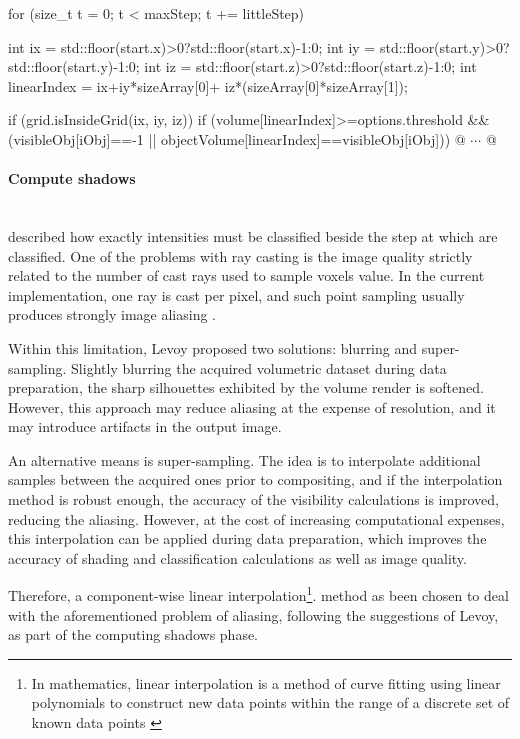 \documentclass[12pt,a4paper]{extarticle}
\newcommand{\linespace}{\vspace{0pt}}
\newcommand{\myparagraph}[1]{\paragraph{#1}\mbox{}\\}
\begin{document}
\begin{cpp}[caption={Intensities classification loop with threshold test and object-wise classification.},label=code:classification]
for (size_t t = 0; t < maxStep; t += littleStep) {
	int ix = std::floor(start.x)>0?std::floor(start.x)-1:0;
	int iy = std::floor(start.y)>0?std::floor(start.y)-1:0;
	int iz = std::floor(start.z)>0?std::floor(start.z)-1:0;
	int linearIndex = ix+iy*sizeArray[0]+
			iz*(sizeArray[0]*sizeArray[1]);
		
	if (grid.isInsideGrid(ix, iy, iz)) {
		if (volume[linearIndex]>=options.threshold && 
			(visibleObj[iObj]==-1 || 
			 objectVolume[linearIndex]==visibleObj[iObj])) {
		@ $\cdots$ @
		}
	}
}
\end{cpp}

\myparagraph{Compute shadows}
\cite{levoy_1988:4} described how exactly intensities must be classified beside the step at which are classified.
One of the problems with ray casting is the image quality strictly related to the number of cast rays used to sample voxels value. In the current implementation, one ray is cast per pixel, and such point sampling usually produces strongly image aliasing \cite{levoy_1988:4}.

Within this limitation, Levoy proposed two solutions: blurring and super-sampling. Slightly blurring the acquired volumetric dataset during data preparation, the sharp silhouettes exhibited by the volume render is softened. However, this approach may reduce aliasing at the expense of resolution, and it may introduce artifacts in the output image.


An alternative means is super-sampling. The idea is to interpolate additional samples between the acquired ones prior to compositing, and if the interpolation method is robust enough, the accuracy of the visibility calculations is improved, reducing the aliasing. However, at the cost of increasing computational expenses, this interpolation can be applied during data preparation, which improves the accuracy of shading and classification calculations as well as image quality.


Therefore, a component-wise linear interpolation\footnote{In mathematics, linear interpolation is a method of curve fitting using linear polynomials to construct new data points within the range of a discrete set of known data points \cite{993400}}. method as been chosen to deal with the aforementioned problem of aliasing, following the suggestions of Levoy, as part of the computing shadows phase.
\linespace
\end{document}
